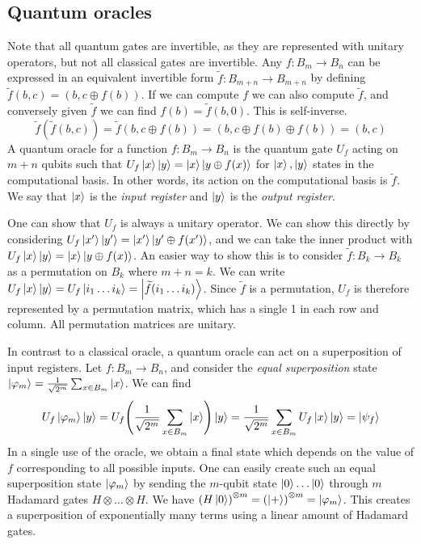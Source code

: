 \subsection{Quantum oracles}
Note that all quantum gates are invertible, as they are represented with unitary operators, but not all classical gates are invertible.
Any \( f \colon B_m \to B_n \) can be expressed in an equivalent invertible form \( \widetilde f \colon B_{m+n} \to B_{m+n} \) by defining \( \widetilde f(b,c) = (b, c \oplus f(b)) \).
If we can compute \( f \) we can also compute \( \widetilde f \), and conversely given \( \widetilde f \) we can find \( f(b) = \widetilde f(b, 0) \).
This is self-inverse.
\[ \widetilde f(\widetilde f(b,c)) = \widetilde f(b, c \oplus f(b)) = (b, c \oplus f(b) \oplus f(b)) = (b, c) \]
A quantum oracle for a function \( f \colon B_m \to B_n \) is the quantum gate \( U_f \) acting on \( m + n \) qubits such that \( U_f \ket{x} \ket{y} = \ket{x} \ket{y \oplus f(x)} \) for \( \ket{x}, \ket{y} \) states in the computational basis.
In other words, its action on the computational basis is \( \widetilde f \).
We say that \( \ket{x} \) is the \emph{input register} and \( \ket{y} \) is the \emph{output register}.

One can show that \( U_f \) is always a unitary operator.
We can show this directly by considering \( U_f \ket{x'}\ket{y'} = \ket{x'}\ket{y' \oplus f(x')} \), and we can take the inner product with \( U_f \ket{x} \ket{y} = \ket{x} \ket{y \oplus f(x)} \).
An easier way to show this is to consider \( \widetilde f \colon B_k \to B_k \) as a permutation on \( B_k \) where \( m + n = k \).
We can write \( U_f \ket{x} \ket{y} = U_f \ket{i_1 \dots i_k} = \ket{\widetilde f(i_1 \dots i_k)} \).
Since \( \widetilde f \) is a permutation, \( U_f \) is therefore represented by a permutation matrix, which has a single 1 in each row and column.
All permutation matrices are unitary.

In contrast to a classical oracle, a quantum oracle can act on a superposition of input registers.
Let \( f \colon B_m \to B_n \), and consider the \emph{equal superposition} state \( \ket{\varphi_m} = \frac{1}{\sqrt{2^m}} \sum_{x \in B_m} \ket{x} \).
We can find
\[ U_f \ket{\varphi_m} \ket{y} = U_f \qty( \frac{1}{\sqrt{2^m}} \sum_{x \in B_m} \ket{x}) \ket{y} = \frac{1}{\sqrt{2^m}} \sum_{x \in B_m} U_f \ket{x} \ket{y} = \ket{\psi_f} \]
In a single use of the oracle, we obtain a final state which depends on the value of \( f \) corresponding to all possible inputs.
One can easily create such an equal superposition state \( \ket{\varphi_m} \) by sending the \( m \)-qubit state \( \ket{0} \dots \ket{0} \) through \( m \) Hadamard gates \( H \otimes \dots \otimes H \).
We have \( \qty(H \ket{0})^{\otimes m} = \qty(\ket{+})^{\otimes m} = \ket{\varphi_m} \).
This creates a superposition of exponentially many terms using a linear amount of Hadamard gates.

